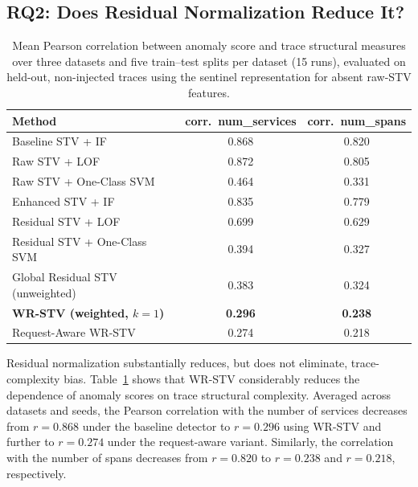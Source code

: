 \documentclass[informatics,article,submit,moreauthors]{Definitions/mdpi}
\newcommand{\rev}[1]{{\color{revisionblue}#1}}
\begin{document}
\subsection{RQ2: Does Residual Normalization Reduce It?}

\begin{table}[t]
    \centering
    \caption{\rev{Mean Pearson correlation between anomaly score and trace
        structural measures over three datasets and five train--test splits
        per dataset (15 runs), evaluated on held-out, non-injected traces
        using the sentinel representation for absent raw-STV features.}}
    \label{tab:complexity-bias-all-methods}
    \begin{tabular}{lcc}
        \toprule
        \textbf{Method} &
        \textbf{corr.\ num\_services} &
        \textbf{corr.\ num\_spans} \\
        \midrule
        Baseline STV + IF                 & 0.868 & 0.820 \\
        \rev{Raw STV + LOF}               & \rev{0.872} & \rev{0.805} \\
        \rev{Raw STV + One-Class SVM}     & \rev{0.464} & \rev{0.331} \\
        Enhanced STV + IF                 & 0.835 & 0.779 \\
        \rev{Residual STV + LOF}          & \rev{0.699} & \rev{0.629} \\
        \rev{Residual STV + One-Class SVM}& \rev{0.394} & \rev{0.327} \\
        Global Residual STV (unweighted)  & 0.383 & 0.324 \\
        \textbf{WR-STV (weighted, \(k=1\))}
                                           & \textbf{0.296} & \textbf{0.238} \\
        Request-Aware WR-STV              & 0.274 & 0.218 \\
        \bottomrule
    \end{tabular}
\end{table}

Residual normalization substantially reduces, but does not eliminate,
trace-complexity bias. Table~\ref{tab:complexity-bias-all-methods} shows
that WR-STV considerably reduces the dependence of anomaly scores on
trace structural complexity. Averaged across datasets and seeds, the
Pearson correlation with the number of services decreases from
\(r=0.868\) under the baseline detector to \(r=0.296\) using WR-STV and
further to \(r=0.274\) under the request-aware variant. Similarly, the
correlation with the number of spans decreases from \(r=0.820\) to
\(r=0.238\) and \(r=0.218\), respectively.
\end{document}
